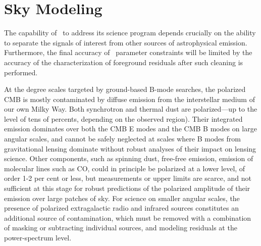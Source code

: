 
%
%

\section{Sky Modeling}
\label{sec:skymodel}

The capability of \cmbexp\ to address its science program depends crucially on the ability to separate the signals of interest from other sources of astrophysical emission. Furthermore, the final accuracy of \cmbexp\ parameter constraints will be limited by the accuracy of the characterization of foreground residuals after such cleaning is performed. 

At the degree scales targeted by ground-based B-mode searches, the polarized CMB is mostly contaminated by diffuse emission from the interstellar medium of our own Milky Way. Both synchrotron and thermal dust are polarized---up to the level of tens of percents, depending on the observed region). Their integrated emission dominates over both the CMB E modes and the CMB B modes on large angular scales, and cannot be safely neglected at scales where B modes from gravitational lensing dominate without robust analyses of their impact on lensing science. Other components, such as spinning dust, free-free emission, emission of molecular lines such as CO, could in principle be polarized at a lower level, of order 1-2 per cent or less, but measurements or upper limits are scarce, and not sufficient at this stage for robust predictions of the polarized amplitude of their emission over large patches of sky. For science on smaller angular scales, the presence of polarized extragalactic radio and infrared sources constitutes an additional source of contamination, which must be removed with a combination of masking or subtracting individual sources, and modeling residuals at the power-spectrum level.

